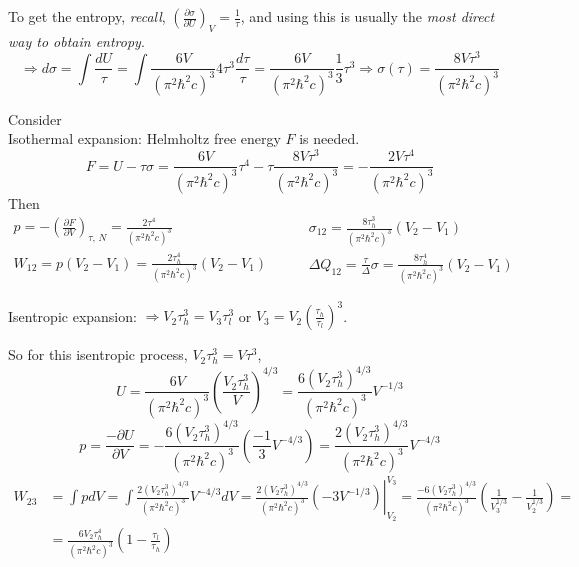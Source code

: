 \documentclass[twoside]{amsart}
\theoremstyle{plain}
\theoremstyle{definition}
\begin{document}
To get the entropy, \emph{recall}, $\left( \frac{ \partial \sigma}{ \partial U} \right)_V = \frac{1}{\tau}$, and using this is usually the \emph{most direct way to obtain entropy}.
\[
\Longrightarrow d\sigma = \int \frac{dU}{ \tau} = \int \frac{6V}{ (\pi^2 \hbar^2 c)^3 } 4 \tau^3 \frac{d\tau}{ \tau} = \frac{6V}{ (\pi^2 \hbar^2 c)^3} \frac{1}{3} \tau^3 \Longrightarrow \boxed{ \sigma(\tau) = \frac{ 8 V \tau^3 }{ (\pi^2 \hbar^2 c)^3 } }
\]  

Consider  \\
Isothermal expansion: Helmholtz free energy $F$ is needed.  
\[
F = U - \tau \sigma = \frac{ 6V}{ (\pi^2 \hbar^2 c)^3 } \tau^4 - \tau \frac{ 8 V \tau^3 }{ (\pi^2 \hbar^2 c)^3 } = -\frac{ 2 V \tau^4 }{ (\pi^2 \hbar^2 c)^3 }
\]
Then 
\[
\begin{gathered}
p  = -\left( \frac{ \partial F}{ \partial V} \right)_{ \tau, \, N} = \frac{2 \tau^4}{ (\pi^2 \hbar^2 c)^3 } \\
W_{12} = p (V_2 - V_1) = \frac{ 2 \tau_h^4 }{ (\pi^2 \hbar^2 c)^3 } (V_2 - V_1)
\end{gathered} \quad \quad \, 
\begin{gathered}
\sigma_{12} = \frac{ 8 \tau_h^3 }{ (\pi^2 \hbar^2 c)^3 }(V_2 - V_1)  \\
\Delta Q_{12} = \frac{ \tau} \Delta \sigma = \frac{ 8 \tau_h^4}{ (\pi^2 \hbar^2 c)^3} (V_2 - V_1)
\end{gathered}
\]

Isentropic expansion: $\Longrightarrow V_2 \tau_h^3 = V_3 \tau_l^3$ or $V_3 = V_2 \left( \frac{ \tau_h}{\tau_l }\right)^3$.  

So for this isentropic process, $V_2 \tau_h^3 = V\tau^3$, 
\[
U = \frac{6V}{ (\pi^2 \hbar^2 c)^3} \left( \frac{V_2 \tau_h^3}{V}\right)^{4/3} = \frac{ 6(V_2 \tau_h^3 )^{4/3} }{ (\pi^2 \hbar^2 c)^3} V^{-1/3}
\]
\[
p = \frac{- \partial U}{ \partial V} = - \frac{ 6 (V_2 \tau_h^3 )^{4/3} }{ (\pi^2 \hbar^2 c)^3} \left( \frac{-1}{3} V^{-4/3} \right) = \frac{ 2 ( V_2 \tau_h^3 )^{4/3} }{ (\pi^2 \hbar^2 c )^3 } V^{-4/3}
\]
\[
\begin{aligned}
W_{23} & = \int p dV = \int \frac{ 2 (V_2 \tau_h^3 )^{4/3}}{ (\pi^2 \hbar^2 c)^3 } V^{-4/3} dV = \left. \frac{ 2 (V_2 \tau_h^3 )^{4/3} }{ (\pi^2 \hbar^2 c)^3}  ( -3V^{-1/3} ) \right|_{V_2}^{V_3} = \frac{ -6 (V_2 \tau_h^3 )^{4/3} }{ (\pi^2 \hbar^2 c)^3 } \left( \frac{1}{V_3^{1/3}} - \frac{1}{ V_2^{1/3} } \right) = \\
& = \frac{ 6 V_2 \tau_h^4}{ (\pi^2 \hbar^2 c)^3} \left( 1 - \frac{\tau_l }{\tau_h} \right)
\end{aligned}
\]
\end{document}
